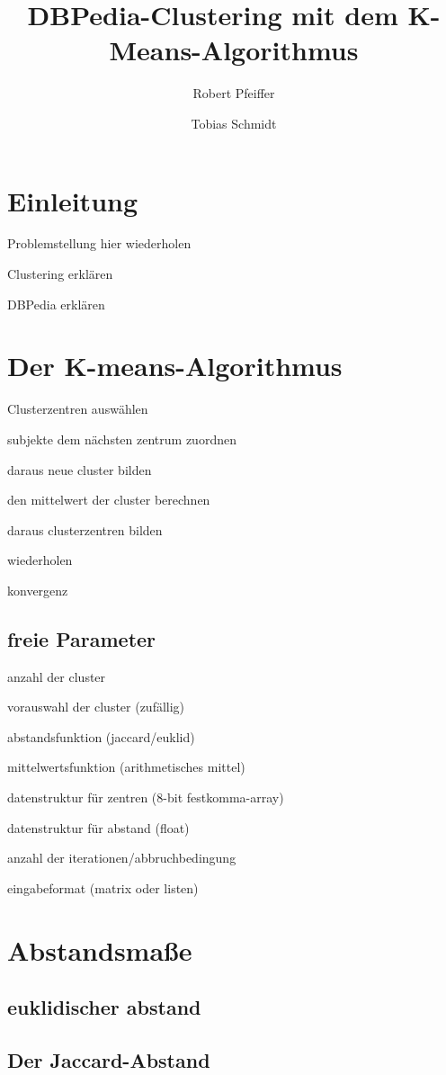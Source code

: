 \documentclass[a4paper,11pt]{article}
\title{DBPedia-Clustering mit dem K-Means-Algorithmus}
\author{Robert Pfeiffer \and Tobias Schmidt}
\begin{document}
\maketitle
\section{Einleitung}
Problemstellung hier wiederholen

Clustering erklären

DBPedia erklären

\section{Der K-means-Algorithmus}

Clusterzentren auswählen

subjekte dem nächsten zentrum zuordnen

daraus neue cluster bilden

den mittelwert der cluster berechnen

daraus clusterzentren bilden

wiederholen

konvergenz

\subsection{freie Parameter}
anzahl der cluster

vorauswahl der cluster (zufällig)

abstandsfunktion (jaccard/euklid)

mittelwertsfunktion (arithmetisches mittel)

datenstruktur für zentren (8-bit festkomma-array)

datenstruktur für abstand (float)

anzahl der iterationen/abbruchbedingung

eingabeformat (matrix oder listen)

\section{Abstandsmaße}
\subsection{euklidischer abstand}
\subsection{Der Jaccard-Abstand}
\end{document}
